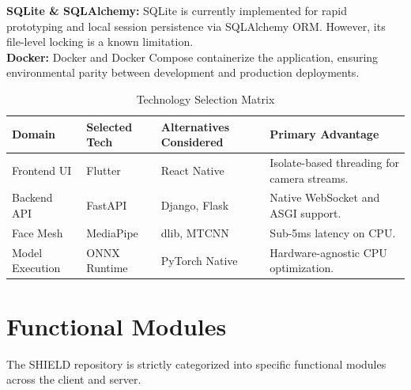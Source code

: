 \documentclass[12pt, a4paper]{report}
\begin{document}
\vspace{1em}
\textbf{SQLite \& SQLAlchemy:} SQLite is currently implemented for rapid prototyping and local session persistence via SQLAlchemy ORM. However, its file-level locking is a known limitation.
\\
\textbf{Docker:} Docker and Docker Compose containerize the application, ensuring environmental parity between development and production deployments.

\begin{table}[H]
\centering
\caption{Technology Selection Matrix}
\begin{tabularx}{\textwidth}{|X|X|X|X|}
\hline
\textbf{Domain} & \textbf{Selected Tech} & \textbf{Alternatives Considered} & \textbf{Primary Advantage} \\
\hline
Frontend UI & Flutter & React Native & Isolate-based threading for camera streams. \\
Backend API & FastAPI & Django, Flask & Native WebSocket and ASGI support. \\
Face Mesh & MediaPipe & dlib, MTCNN & Sub-5ms latency on CPU. \\
Model Execution & ONNX Runtime & PyTorch Native & Hardware-agnostic CPU optimization. \\
\hline
\end{tabularx}
\end{table}

\chapter{Functional Modules}

The SHIELD repository is strictly categorized into specific functional modules across the client and server.
\end{document}
